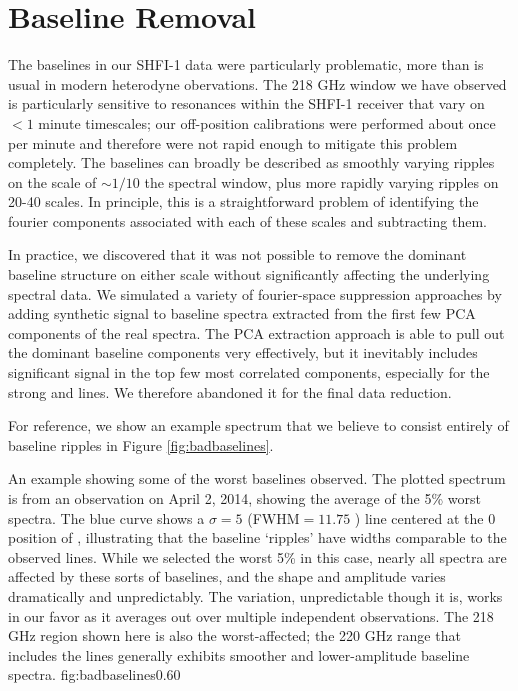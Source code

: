 \appendix
\section{Baseline Removal}
\label{sec:baselineappendix}
The baselines in our SHFI-1 data were particularly problematic, more than is
usual in modern heterodyne obervations.  The 218 GHz window we have observed is
particularly sensitive to resonances within the SHFI-1 receiver that vary on
$<1$ minute timescales; our off-position calibrations were performed about once
per minute and therefore were not rapid enough to mitigate this problem
completely.  The baselines can broadly be described as smoothly varying ripples
on the scale of $\sim1/10$ the spectral window, plus more rapidly varying
ripples on 20-40 \kms scales.  In principle, this is a straightforward problem
of identifying the fourier components associated with each of these scales and
subtracting them.

In practice, we discovered that it was not possible to remove the dominant
baseline structure on either scale without significantly affecting the
underlying spectral data.  We simulated a variety of fourier-space suppression
approaches by adding synthetic signal to baseline spectra extracted from the
first few PCA components of the real spectra.
The PCA extraction approach is able to pull out the dominant baseline
components very effectively, but it inevitably includes significant signal in
the top few most correlated components, especially for the strong \formaldehyde
and \thirteenco lines.  We therefore abandoned it for the final data reduction.

For reference, we show an example spectrum that we believe to consist entirely
of baseline ripples in Figure \ref{fig:badbaselines}.

{An example showing some of the worst baselines observed.  The plotted spectrum
is from an observation on April 2, 2014, showing the average of the 5\% worst
spectra.  The blue curve shows a $\sigma=5$ \kms (FWHM$=11.75$ \kms) line centered
at the 0 \kms position of \para \threeohthree,
illustrating that the baseline `ripples' have widths comparable to the observed
lines.  While we selected the worst 5\% in this case, nearly all spectra are
affected by these sorts of baselines, and the shape and amplitude varies
dramatically and unpredictably.  The variation, unpredictable though it is,
works in our favor as it averages out over multiple independent observations.
The 218 GHz region shown here is also the worst-affected; the 220 GHz range
that includes the \thirteenco lines generally exhibits smoother and
lower-amplitude baseline spectra.}
{fig:badbaselines}{0.6}{0}

